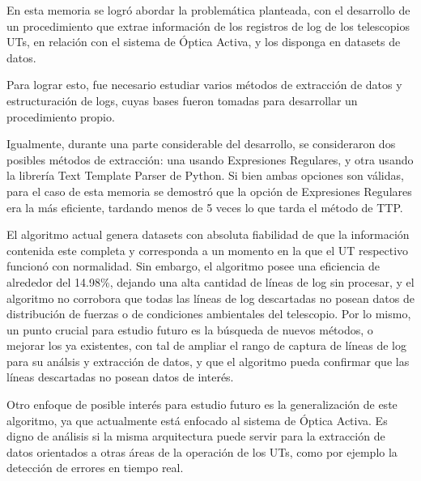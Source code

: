 
En esta memoria se logró abordar la problemática planteada, con el desarrollo de un procedimiento que extrae información de los registros de log de los telescopios UTs, en relación con el sistema de Óptica Activa, y los disponga en datasets de datos.

Para lograr esto, fue necesario estudiar varios métodos de extracción de datos y estructuración de logs, cuyas bases fueron tomadas para desarrollar un procedimiento propio.

Igualmente, durante una parte considerable del desarrollo, se consideraron dos posibles métodos de extracción: una usando Expresiones Regulares, y otra usando la librería Text Template Parser de Python. Si bien ambas opciones son válidas, para el caso de esta memoria se demostró que la opción de Expresiones Regulares era la más eficiente, tardando menos de 5 veces lo que tarda el método de TTP.

El algoritmo actual genera datasets con absoluta fiabilidad de que la información contenida este completa y corresponda a un momento en la que el UT respectivo funcionó con normalidad. Sin embargo, el algoritmo posee una eficiencia de alrededor del 14.98\%, dejando una alta cantidad de líneas de log sin procesar, y el algoritmo no corrobora que todas las líneas de log descartadas no posean datos de distribución de fuerzas o de condiciones ambientales del telescopio. Por lo mismo, un punto crucial para estudio futuro es la búsqueda de nuevos métodos, o mejorar los ya existentes, con tal de ampliar el rango de captura de líneas de log para su análsis y extracción de datos, y que el algoritmo pueda confirmar que las líneas descartadas no posean datos de interés.

Otro enfoque de posible interés para estudio futuro es la generalización de este algoritmo, ya que actualmente está enfocado al sistema de Óptica Activa. Es digno de análisis si la misma arquitectura puede servir para la extracción de datos orientados a otras áreas de la operación de los UTs, como por ejemplo la detección de errores en tiempo real.